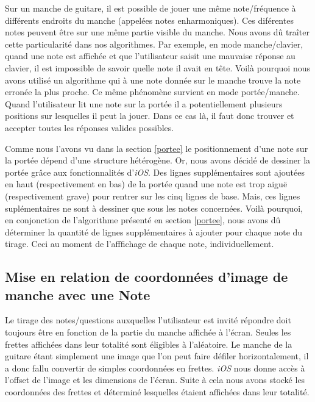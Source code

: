 \documentclass{scrreprt}
\begin{document}
Sur un manche de guitare, il est possible de jouer une même note/fréquence à différents endroits du manche (appelées notes enharmoniques).
Ces diférentes notes peuvent être sur une même partie visible du manche.
Nous avons dû traîter cette particularité dans nos algorithmes.
Par exemple, en mode manche/clavier, quand une note est affichée et que l'utilisateur saisit une mauvaise réponse au clavier, il est impossible de savoir quelle note il avait en tête.
Voilà pourquoi nous avons utilisé un algorithme qui à une note donnée sur le manche trouve la note erronée la plus proche.
Ce même phénomène survient en mode portée/manche.
Quand l'utilisateur lit une note sur la portée il a potentiellement plusieurs positions sur lesquelles il peut la jouer.
Dans ce cas là, il faut donc trouver et accepter toutes les réponses valides possibles.
\newline

Comme nous l'avons vu dans la section \ref{portee} le positionnement d'une note sur la portée dépend d'une structure hétérogène.
Or, nous avons décidé de dessiner la portée grâce aux fonctionnalités d'\textit{iOS}.
Des lignes supplémentaires sont ajoutées en haut (respectivement en bas) de la portée quand une note est trop aiguë (respectivement grave) pour rentrer sur les cinq lignes de base.
Mais, ces lignes suplémentaires ne sont à dessiner que sous les notes concernées.
Voilà pourquoi, en conjonction de l'algorithme présenté en section \ref{portee}, nous avons dû déterminer la quantité de lignes supplémentaires à ajouter pour chaque note du tirage.
Ceci au moment de l'afffichage de chaque note, individuellement.

\subsection{Mise en relation de coordonnées d'image de manche avec une Note}
Le tirage des notes/questions auxquelles l'utilisateur est invité répondre doit toujours être en fonction de la partie du manche affichée à l'écran. 
Seules les frettes affichées dans leur totalité sont éligibles à l'aléatoire.
Le manche de la guitare étant simplement une image que l'on peut faire défiler horizontalement, il a donc fallu convertir de simples coordonnées en frettes.
\textit{iOS} nous donne accès à l'offset de l'image et les dimensions de l'écran.
Suite à cela nous avons stocké les coordonnées des frettes et déterminé lesquelles étaient affichées dans leur totalité.
\newline
\end{document}
